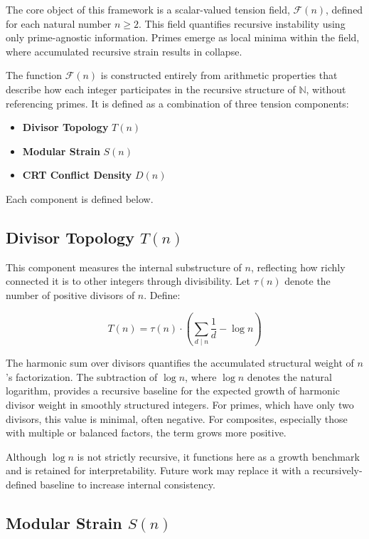 \documentclass[11pt]{article}
\begin{document}
The core object of this framework is a scalar-valued tension field, $\mathcal{F}(n)$, defined for each natural number $n \geq 2$. This field quantifies recursive instability using only prime-agnostic information. Primes emerge as local minima within the field, where accumulated recursive strain results in collapse.

The function $\mathcal{F}(n)$ is constructed entirely from arithmetic properties that describe how each integer participates in the recursive structure of $\mathbb{N}$, without referencing primes. It is defined as a combination of three tension components:

\begin{itemize}
  \item \textbf{Divisor Topology} $T(n)$
  \item \textbf{Modular Strain} $S(n)$
  \item \textbf{CRT Conflict Density} $D(n)$
\end{itemize}

Each component is defined below.

\subsection{Divisor Topology $T(n)$}

This component measures the internal substructure of $n$, reflecting how richly connected it is to other integers through divisibility. Let $\tau(n)$ denote the number of positive divisors of $n$. Define:

\[
T(n) = \tau(n) \cdot \left( \sum_{d \mid n} \frac{1}{d} - \log n \right)
\]

The harmonic sum over divisors quantifies the accumulated structural weight of $n$'s factorization. The subtraction of $\log n$, where $\log n$ denotes the natural logarithm, provides a recursive baseline for the expected growth of harmonic divisor weight in smoothly structured integers. For primes, which have only two divisors, this value is minimal, often negative. For composites, especially those with multiple or balanced factors, the term grows more positive.

Although $\log n$ is not strictly recursive, it functions here as a growth benchmark and is retained for interpretability. Future work may replace it with a recursively-defined baseline to increase internal consistency.

\subsection{Modular Strain $S(n)$}
\end{document}
